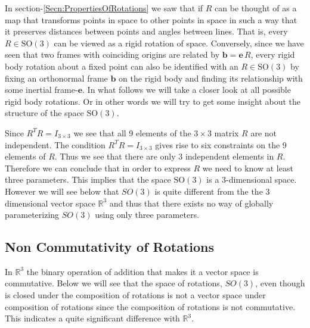 \documentclass[graybox,envcountchap,sectrefs]{svmonoMuga}
\begin{document}
In section-\ref{Secn:PropertiesOfRotations} we saw that if $R$ can be thought of as a map that transforms points in space to other points in space in such a way that it preserves distances between points and angles between lines. That is, every $R\in \mathrm{SO}(3)$ can be viewed as a rigid rotation of space. Conversely, since we have seen that two frames with coinciding origins are related by $\mathbf{b}=\mathbf{e}\,R$, every rigid body rotation about a fixed point can also be identified with an $R\in \mathrm{SO}(3)$ by fixing an orthonormal frame $\mathbf{b}$ on the rigid body and finding its relationship with some inertial frame-$\mathbf{e}$. In what follows we will take a closer look at all possible rigid body rotations. Or in other words we will try to get some insight about the structure of the space $\mathrm{SO}(3)$.


Since $R^TR=I_{3\times 3}$ we see that all 9 elements of the ${3\times 3}$ matrix $R$ are not independent. The condition $R^TR=I_{3\times 3}$ gives rise to six constraints on the 9 elements of $R$. Thus we see that there are only 3 independent elements in $R$. Therefore we can conclude that in order to express $R$ we need to know at least three parameters. This implies that the space $\mathrm{SO}(3)$ is a 3-dimensional space. However we will see below that $SO(3)$ is quite different from the the 3 dimensional vector space $\mathbb{R}^3$ and thus that there exists no way of globally parameterizing $SO(3)$ using only three parameters.

\subsection{Non Commutativity of Rotations}
In $\mathbb{R}^3$ the binary operation of addition that makes it a vector space is commutative.  Below we will see that the space of rotations, $SO(3)$, even though is closed under the composition of rotations is not a vector space under composition of rotations since the composition of rotations is not commutative. This indicates a quite significant difference with $\mathbb{R}^3$.
\end{document}
